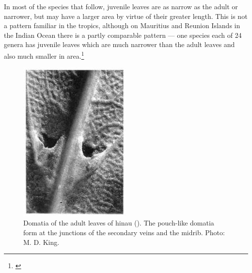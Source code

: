 In most of the species that follow, juvenile leaves are as narrow as the adult or narrower, but may have a larger area by virtue of their greater length.
This is not a pattern familiar in the tropics, although on Mauritius and Reunion Islands in the Indian Ocean there is a partly comparable pattern — one species each of 24 genera has juvenile leaves which are much narrower than the adult leaves and also much smaller in area.\footnote{\cite{friedmann1976observations}}

\begin{figure}
	\includegraphics[width=0.5\textwidth]{graphics/figure23hinau.jpg}
	\centering
	\caption[Domatia of the adult leaves of hinau]{Domatia of the adult leaves of hinau ().
The pouch-like domatia form at the junctions of the secondary veins and the midrib.
	Photo: M. D. King.}
	\label{fig:23hinau}
\end{figure}

